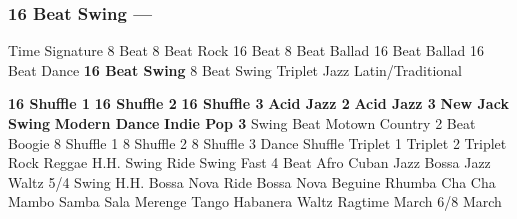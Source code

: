 \subsubsection[16 Beat Swing]{16 Beat Swing --- \UiKey{\II}\UiKey{\MET}}
Time Signature
8 Beat
8 Beat Rock
16 Beat
8 Beat Ballad
16 Beat Ballad
16 Beat Dance
\textbf{16 Beat Swing}
8 Beat Swing
Triplet
Jazz
Latin/Traditional





























\textbf{16 Shuffle 1}
\textbf{16 Shuffle 2}
\textbf{16 Shuffle 3}
\textbf{Acid Jazz 2}
\textbf{Acid Jazz 3}
\textbf{New Jack Swing}
\textbf{Modern Dance}
\textbf{Indie Pop 3}
Swing Beat
Motown
Country 2 Beat
Boogie
8 Shuffle 1
8 Shuffle 2
8 Shuffle 3
Dance Shuffle
Triplet 1
Triplet 2
Triplet Rock
Reggae
H.H. Swing
Ride Swing
Fast 4 Beat
Afro Cuban
Jazz Bossa
Jazz Waltz
5/4 Swing
H.H. Bossa Nova
Ride Bossa Nova
Beguine
Rhumba
Cha Cha
Mambo
Samba
Sala
Merenge
Tango
Habanera
Waltz
Ragtime
March
6/8 March
